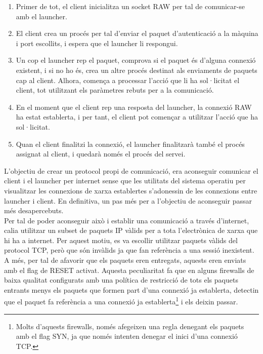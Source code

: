 \begin{enumerate}
    \item Primer de tot, el client inicialitza un socket RAW per tal de comunicar-se amb el launcher.
    \item El client crea un procés per tal d'enviar el paquet d'autenticació a la màquina i port escollits,
        i espera que el launcher li respongui.
    \item Un cop el launcher rep el paquet, comprova si el paquet és d'alguna connexió existent, i si no
        ho és, crea un altre procés destinat als enviaments de paquets cap al client. Alhora, comença a
        processar l'acció que li ha sol·licitat el client, tot utilitzant els paràmetres rebuts per a la 
        comunicació.
    \item En el moment que el client rep una resposta del launcher, la connexió RAW ha estat establerta, i 
        per tant, el client pot començar a utilitzar l'acció que ha sol·licitat.
    \item Quan el client finalitzi la connexió, el launcher finalitzarà també el procés assignat al client,
        i quedarà només el procés del servei.
\end{enumerate}

L'objectiu de crear un protocol propi de comunicació, era aconseguir comunicar el client i el launcher per
internet sense que les utilitats del sistema operatiu per visualitzar les connexions de xarxa establertes
s'adonessin de les connexions entre launcher i client. En definitiva, un pas més per a l'objectiu de aconseguir 
passar més desapercebuts. \\

Per tal de poder aconseguir això i establir una comunicació a través d'internet, calia utilitzar un subset de 
paquets IP vàlids per a tota l'electrònica de xarxa que hi ha a internet. Per aquest motiu, es va escollir
utilitzar paquets vàlids del protocol TCP, però que són invàlids ja que fan referència a una sessió inexistent.
A més, per tal de afavorir que els paquets eren entregats, aquests eren enviats amb el flag de RESET activat. 
Aquesta peculiaritat fa que en alguns firewalls de baixa qualitat configurats amb una política de restricció de 
tots els paquets entrants menys els paquets que formen part d'una connexió ja establerta, detectin que el paquet
fa referència a una connexió ja establerta\footnote{Molts d'aquests firewalls, només afegeixen una regla denegant
els paquets amb el flag SYN, ja que només intenten denegar el inici d'una connexió TCP.} i els deixin passar. \\

